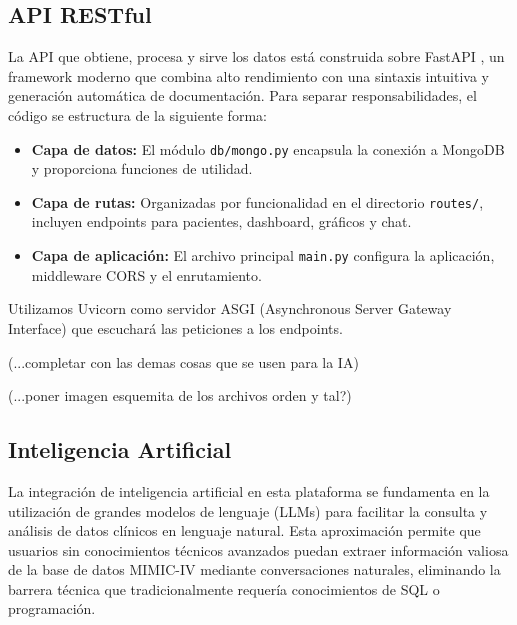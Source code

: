 




\subsection{API RESTful}

La API que obtiene, procesa y sirve los datos está construida sobre FastAPI \cite{fastapi}, un framework moderno que combina alto rendimiento con una sintaxis intuitiva y generación automática de documentación. Para separar responsabilidades, el código se estructura de la siguiente forma:

\begin{itemize}
\item \textbf{Capa de datos:} El módulo \texttt{db/mongo.py} encapsula la conexión a MongoDB y proporciona funciones de utilidad.
\item \textbf{Capa de rutas:} Organizadas por funcionalidad en el directorio \texttt{routes/}, incluyen endpoints para pacientes, dashboard, gráficos y chat.
\item \textbf{Capa de aplicación:} El archivo principal \texttt{main.py} configura la aplicación, middleware CORS y el enrutamiento.
\end{itemize}

Utilizamos Uvicorn como servidor ASGI (Asynchronous Server Gateway Interface) que escuchará las peticiones a los endpoints. 

(...completar con las demas cosas que se usen para la IA)

(...poner imagen esquemita de los archivos orden y tal?)


\subsection{Inteligencia Artificial}

La integración de inteligencia artificial en esta plataforma se fundamenta en la utilización de grandes modelos de lenguaje (LLMs) para facilitar la consulta y análisis de datos clínicos en lenguaje natural. Esta aproximación permite que usuarios sin conocimientos técnicos avanzados puedan extraer información valiosa de la base de datos MIMIC-IV mediante conversaciones naturales, eliminando la barrera técnica que tradicionalmente requería conocimientos de SQL o programación.

